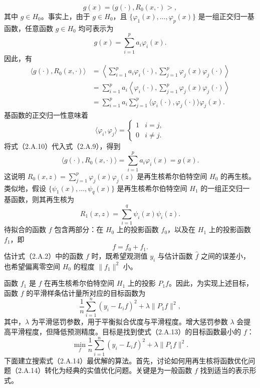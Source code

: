 \begin{equation}
g(x)=\bigl(g(\cdot),R_0(x,\cdot)\bigr>,\tag{2.A.7}
\end{equation}
其中 $g\in H_0$。事实上，由于 $g\in H_0$，且 $\{\varphi_1(x),\ldots,\varphi_p(x)\}$ 是一组正交归一基函数，任意函数 $g\in H_0$ 均可表示为
\begin{equation}
g(x)=\sum_{i=1}^pa_i\varphi_i(x).\tag{2.A.8}
\end{equation}
因此，有
\begin{equation}
\begin{aligned}
\langle g(\cdot),R_0(x,\cdot)\rangle
 &=\left\langle\sum_{i=1}^pa_i\varphi_i(\cdot),
       \sum_{j=1}^p\varphi_j(x)\varphi_j(\cdot)\right\rangle\\
 &=\sum_{i=1}^pa_i\left\langle\varphi_i(\cdot),
       \sum_{j=1}^p\varphi_j(x)\varphi_j(\cdot)\right\rangle\\
 &=\sum_{i=1}^pa_i\sum_{j=1}^p
       \langle\varphi_i(\cdot),\varphi_j(\cdot)\rangle\varphi_j(x).
\end{aligned}\tag{2.A.9}
\end{equation}
基函数的正交归一性意味着
\begin{equation}
\langle\varphi_i,\varphi_j\rangle=
\begin{cases}
1&i=j,\\
0&i\ne j.
\end{cases}\tag{2.A.10}
\end{equation}
将式（2.A.10）代入式（2.A.9），得到
\[
\langle g(\cdot),R_0(x,\cdot)\rangle
 =\sum_{i=1}^pa_i\varphi_i(x)=g(x).
\]
这说明 $R_0(x,z)=\sum_{j=1}^p\varphi_j(x)\varphi_j(z)$ 是再生核希尔伯特空间 $H_0$ 的再生核。类似地，假设 $\{\psi_1(x),\ldots,\psi_q(x)\}$ 是再生核希尔伯特空间 $H_1$ 的一组正交归一基函数，则其再生核为
\begin{equation}
R_1(x,z)=\sum_{i=1}^q\psi_i(x)\psi_i(z).\tag{2.A.11}
\end{equation}
待拟合的函数 $f$ 包含两部分：在 $H_0$ 上的投影函数 $f_0$，以及在 $H_1$ 上的投影函数 $f_1$，即
\begin{equation}
f=f_0+f_1.\tag{2.A.12}
\end{equation}
估计式（2.A.2）中的函数 $f$ 时，既希望观测值 $y_i$ 与估计函数 $\widehat f$ 之间的误差小，也希望偏离零空间 $H_0$ 的程度 $\|f_1\|^2$ 小。

函数 $f_1$ 是 $f$ 在再生核希尔伯特空间 $H_1$ 上的投影 $P_1f$。因此，为实现上述目标，函数 $f$ 的平滑样条估计量所对应的目标函数为
\begin{equation}
\frac1n\sum_{i=1}^n(y_i-L_if)^2+\lambda\|P_1f\|^2,\tag{2.A.13}
\end{equation}
其中，$\lambda$ 为平滑惩罚参数，用于平衡拟合优度与平滑程度。增大惩罚参数 $\lambda$ 会提高平滑程度，但降低预测精度。目标是找到使式（2.A.13）的目标函数最小的 $f$：
\begin{equation}
\min_f\frac1n\sum_{i=1}^n(y_i-L_if)^2+\lambda\|P_1f\|^2.\tag{2.A.14}
\end{equation}
下面建立搜索式（2.A.14）最优解的算法。首先，讨论如何用再生核将函数优化问题（2.A.14）转化为经典的实值优化问题。关键是为一般函数 $f$ 找到适当的表示形式。

